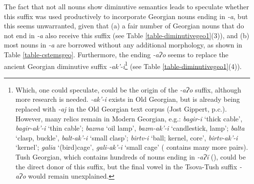 The fact that not all nouns show diminutive semantics leads \textcite{kadagidze87ao} to speculate whether this suffix was used productively to incorporate Georgian nouns ending in \textit{-a}, but this seems unwarranted, given that (a) a fair number of Georgian nouns that do not end in \textit{-a} also receive this suffix (see Table \ref{table-diminutivegeo1}(3)), and (b) most nouns in \textit{-a} are borrowed without any additional morphology, as shown in Table \ref{table-cstemsgeo}. Furthermore, the ending \textit{-aɁo} seems to replace the ancient Georgian diminutive suffix \textit{-ak'-i}\footnote{Which, one could speculate, could be the origin of the \textit{-aɁo} suffix, although more research is needed. \textit{-ak'-i} exists in Old Georgian, but is already being replaced with \textit{-aj} in the Old Georgian text corpus (Jost Gippert, p.c.). However, many relics remain in Modern Georgian, e.g.: \textit{bagir-i} `thick cable', \textit{bagir-ak'-i} `thin cable'; \textit{bazma} `oil lamp', \textit{bazm-ak'-i} `candlestick, lamp'; \textit{balta} `clasp, buckle', \textit{balt-ak'-i} `small clasp'; \textit{birtv-i} `ball; kernel, core', \textit{birtv-ak'-i} `kernel'; \textit{galia} `(bird)cage', \textit{gali-ak'-i} `small cage' (\textcite{rayfield06dict} contains many more pairs). Tush Georgian, which contains hundreds of nouns ending in \textit{-aɁ\u{i}} (\cite{tsotsanidze02tushdict}), could be the direct donor of this suffix, but the final vowel in the Tsova-Tush suffix \textit{-aɁo} would remain unexplained.} (see Table \ref{table-diminutivegeo1}(4)).
\largerpage[-2]\pagebreak

